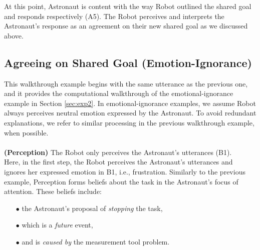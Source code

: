 At this point, Astronaut is content with the way Robot outlined the shared goal
and responds respectively (A5). The Robot perceives and interprets the
Astronaut's response as an agreement on their new shared goal as we discussed
above.\\

\noindent{}

\subsection{Agreeing on Shared Goal (Emotion-Ignorance)}
\label{sec:wt-exp2}

This walkthrough example begins with the same utterance as the previous one, and
it provides the computational walkthrough of the emotional-ignorance example in
Section \ref{sec:exp2}. In emotional-ignorance examples, we assume Robot always
perceives neutral emotion expressed by the Astronaut. To avoid redundant
explanations, we refer to similar processing in the previous walkthrough
example, when possible.\\

\noindent{}\\

\noindent\textbf{(Perception)} The Robot only perceives the Astronaut's
utterances (B1).\\

Here, in the first step, the Robot perceives the Astronaut's utterances and
ignores her expressed emotion in B1, i.e., frustration. Similarly to the
previous example, Perception forms beliefs about the task in the Astronaut's
focus of attention. These beliefs include:

\begin{itemize}
  \item[$\bullet$] the Astronaut's proposal of \textit{stopping} the task,
  \item[$\bullet$] which is a \textit{future} event,
  \item[$\bullet$] and is \textit{caused by} the measurement tool problem.
\end{itemize}

